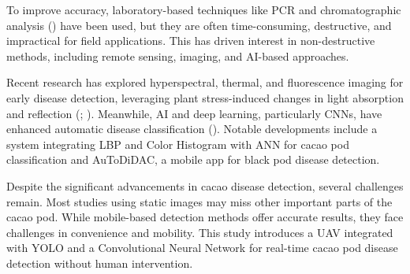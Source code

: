 To improve accuracy, laboratory-based techniques like PCR and chromatographic analysis (\cite{Nguyen2022, Quelal2020}) have been used, but they are often time-consuming, destructive, and impractical for field applications. This has driven interest in non-destructive methods, including remote sensing, imaging, and AI-based approaches.

Recent research has explored hyperspectral, thermal, and fluorescence imaging for early disease detection, leveraging plant stress-induced changes in light absorption and reflection (\cite{Alvarado2023}; \cite{Silva2024}). Meanwhile, AI and deep learning, particularly CNNs, have enhanced automatic disease classification (\cite{BaculioBarbosa2022}). Notable developments include a system integrating LBP and Color Histogram with ANN for cacao pod classification and \cite{Tan2018} AuToDiDAC, a mobile app for black pod disease detection.

Despite the significant advancements in cacao disease detection, several challenges remain. Most studies using static images may miss other important parts of the cacao pod. While mobile-based detection methods offer accurate results, they face challenges in convenience and mobility. This study introduces a UAV integrated with YOLO and a Convolutional Neural Network for real-time cacao pod disease detection without human intervention.
